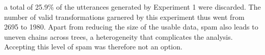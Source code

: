\documentclass[a4paper,fleqn]{cas-dc}
\begin{document}
a total of 25.9\% of the utterances generated by Experiment 1 were discarded.
The number of valid transformations garnered by this experiment thus
went from 2695 to 1980. Apart from reducing the size of the usable data,
spam also leads to uneven chains across trees, a heterogeneity that
complicates the analysis. Accepting this level of spam was therefore not
an option.
\end{document}

